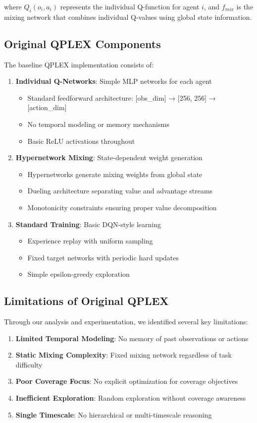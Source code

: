 \documentclass[12pt,a4paper]{report}
\begin{document}
where $Q_i(o_i, a_i)$ represents the individual Q-function for agent $i$, and $f_{mix}$ is the mixing network that combines individual Q-values using global state information.

\subsection{Original QPLEX Components}
The baseline QPLEX implementation consists of:

\begin{enumerate}
\item \textbf{Individual Q-Networks}: Simple MLP networks for each agent
\begin{itemize}
\item Standard feedforward architecture: [obs\_dim] → [256, 256] → [action\_dim]
\item No temporal modeling or memory mechanisms
\item Basic ReLU activations throughout
\end{itemize}

\item \textbf{Hypernetwork Mixing}: State-dependent weight generation
\begin{itemize}
\item Hypernetworks generate mixing weights from global state
\item Dueling architecture separating value and advantage streams
\item Monotonicity constraints ensuring proper value decomposition
\end{itemize}

\item \textbf{Standard Training}: Basic DQN-style learning
\begin{itemize}
\item Experience replay with uniform sampling
\item Fixed target networks with periodic hard updates
\item Simple epsilon-greedy exploration
\end{itemize}
\end{enumerate}

\subsection{Limitations of Original QPLEX}
Through our analysis and experimentation, we identified several key limitations:

\begin{enumerate}
\item \textbf{Limited Temporal Modeling}: No memory of past observations or actions
\item \textbf{Static Mixing Complexity}: Fixed mixing network regardless of task difficulty
\item \textbf{Poor Coverage Focus}: No explicit optimization for coverage objectives
\item \textbf{Inefficient Exploration}: Random exploration without coverage awareness
\item \textbf{Single Timescale}: No hierarchical or multi-timescale reasoning
\end{enumerate}
\end{document}
